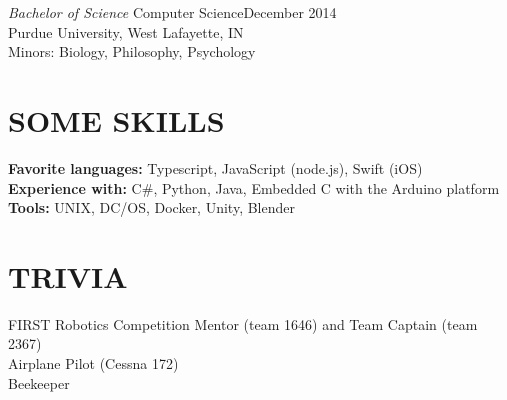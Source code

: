 \documentclass[margin,4pt]{res} %
\begin{document}
\begin{resume}
	{\sl Bachelor of Science} Computer Science\hfill  December 2014\\
		Purdue University, West Lafayette, IN\\
		Minors: Biology, Philosophy, Psychology \\
%

\section{SOME SKILLS} 
	{\bf Favorite languages:} Typescript, JavaScript (node.js), Swift (iOS)\\
 	{\bf Experience with:}  C\#, Python, Java, Embedded C with the Arduino platform \\
	{\bf Tools:} UNIX, DC/OS, Docker, Unity, Blender


\section{TRIVIA}  
	FIRST Robotics Competition Mentor (team 1646) and Team Captain (team 2367)\\
	Airplane Pilot (Cessna 172)\\
	Beekeeper\\


\end{resume}
\end{document}
